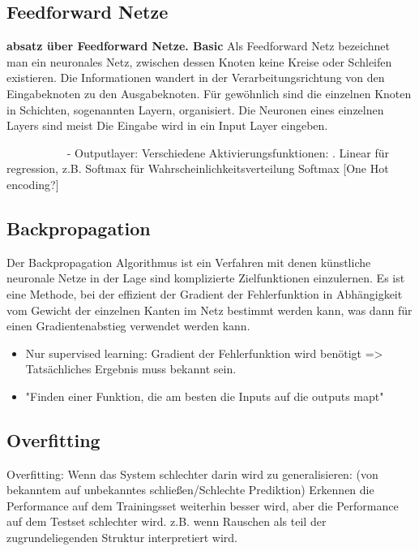 \subsection{Feedforward Netze}

\textbf{absatz über Feedforward Netze. Basic}
Als Feedforward Netz bezeichnet man ein neuronales Netz, zwischen dessen Knoten keine Kreise oder Schleifen existieren.
Die Informationen wandert in der Verarbeitungsrichtung von den Eingabeknoten zu den Ausgabeknoten.
Für gewöhnlich sind die einzelnen Knoten in Schichten, sogenannten Layern, organisiert.
Die Neuronen eines einzelnen Layers sind meist 
Die Eingabe wird in ein Input Layer eingeben.

~~~~~~~~~~
- Outputlayer: Verschiedene Aktivierungsfunktionen:
. Linear für regression, z.B. Softmax für Wahrscheinlichkeitsverteilung Softmax
[One Hot encoding?]

\subsection{Backpropagation}

Der Backpropagation Algorithmus ist ein Verfahren mit denen künstliche neuronale Netze in der Lage sind komplizierte Zielfunktionen einzulernen.
Es ist eine Methode, bei der effizient der Gradient der Fehlerfunktion in Abhängigkeit vom Gewicht der einzelnen Kanten im Netz bestimmt werden kann,
was dann für einen Gradientenabstieg verwendet werden kann. 

\begin{itemize}
	\item Nur supervised learning: Gradient der Fehlerfunktion wird benötigt => Tatsächliches Ergebnis muss bekannt sein.
	\item "Finden einer Funktion, die am besten die Inputs auf die outputs mapt"
\end{itemize}

\subsection{Overfitting}

Overfitting:
	Wenn das System schlechter darin wird zu generalisieren: (von bekanntem auf unbekanntes schließen/Schlechte Prediktion)
	Erkennen die Performance auf dem Trainingsset weiterhin besser wird, aber die Performance auf dem Testset schlechter wird.
	z.B. wenn Rauschen als teil der zugrundeliegenden Struktur interpretiert wird.

